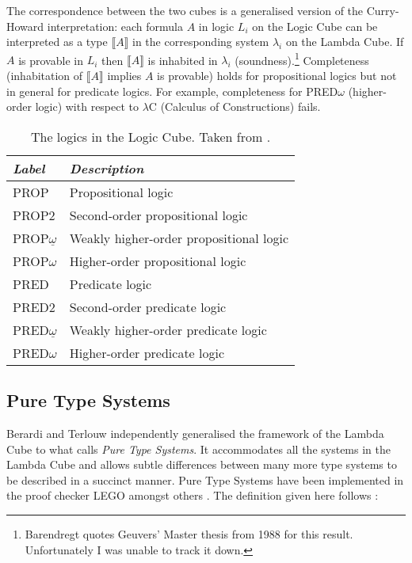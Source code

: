 \documentclass[12pt,toc=bibliography,numbers=noendperiod,
               footnotes=multiple,twoside]{scrartcl}
\begin{document}
The correspondence between the two cubes is a generalised version of the Curry-Howard interpretation: each formula \(A\) in logic \(L_i\) on the Logic Cube can be interpreted as a type \(\llbracket A \rrbracket\) in the corresponding system \(\lambda_i\) on the Lambda Cube. If \(A\) is provable in \(L_i\) then \(\llbracket A \rrbracket\) is inhabited in \(\lambda_i\) (soundness).\footnote{Barendregt quotes Geuvers' Master thesis from 1988 for this result. Unfortunately I was unable to track it down.} Completeness (inhabitation of \(\llbracket A \rrbracket\) implies \(A\) is provable) holds for propositional logics but not in general for predicate logics. For example, completeness for PRED\(\omega\) (higher-order logic) with respect to \(\lambda\)C (Calculus of Constructions) fails.

\begin{table}[h]
    \centering
    \begin{tabular}{l l}
        \toprule
        \textit{Label} & \textit{Description} \\
        \midrule
        PROP & Propositional logic \\
        PROP2 & Second-order propositional logic \\
        PROP\(\underline{\omega}\) & Weakly higher-order propositional logic \\
        PROP\(\omega\) & Higher-order propositional logic \\
        PRED & Predicate logic \\
        PRED2 & Second-order predicate logic \\
        PRED\(\underline{\omega}\) & Weakly higher-order predicate logic \\
        PRED\(\omega\) & Higher-order predicate logic \\
        \bottomrule
    \end{tabular}
    \caption{The logics in the Logic Cube. Taken from \textcite[248]{barendregt_lambda_1992}.}
    \label{tab:l-cube-names}
\end{table}


\subsection{\label{ssc:pts}Pure Type Systems}

Berardi and Terlouw independently generalised the framework of the Lambda Cube to what \textcite{barendregt_lambda_1992} calls \emph{Pure Type Systems}. It accommodates all the systems in the Lambda Cube and allows subtle differences between many more type systems to be described in a succinct manner. Pure Type Systems have been implemented in the proof checker LEGO amongst others \autocite{pollack_theory_1994}. The definition given here follows \textcite[213f.]{barendregt_lambda_1992}:
\end{document}
